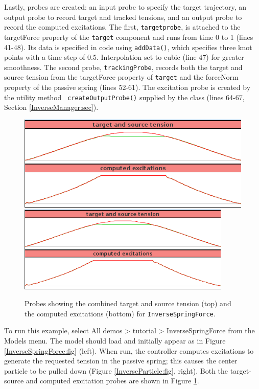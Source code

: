 Lastly, probes are created: an input probe to specify the target trajectory, an
output probe to record target and tracked tensions, and an output probe to
record the computed excitations. The first, {\tt targetprobe}, is attached to
the {\sf targetForce} property of the {\tt target} component and runs from time
0 to 1 (lines 41-48). Its data is specified in code using {\tt addData()},
which specifies three knot points with a time step of 0.5. Interpolation set to
cubic (line 47) for greater smoothness. The second probe, {\tt trackingProbe},
records both the target and source tension from the {\sf targetForce} property
of {\tt target} and the {\sf forceNorm} property of the passive spring (lines
52-61). The excitation probe is created by the utility method {\tt
createOutputProbe()} supplied by the  class
(lines 64-67, Section \ref{InverseManager:sec}).

\begin{figure}[ht]
\begin{center}
\iflatexml
   \includegraphics[]{images/InverseSpringForceProbes}
\else
   \includegraphics[width=4in]{images/InverseSpringForceProbes}
\fi
\end{center}
\caption{Probes showing the combined target and source tension (top)
and the computed excitations (bottom) for {\tt InverseSpringForce}.}
\label{InverseSpringForceProbes:fig}
\end{figure}

To run this example, select {\sf All demos > tutorial > InverseSpringForce}
from the {\sf Models} menu. The model should load and initially appear as in
Figure \ref{InverseSpringForce:fig} (left). When run, the controller computes
excitations to generate the requested tension in the passive spring; this
causes the center particle to be pulled down (Figure \ref{InverseParticle:fig},
right). Both the target-source and computed excitation probes are shown in
Figure \ref{InverseSpringForceProbes:fig}. 

